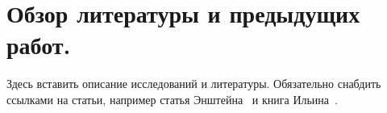 \section{Обзор литературы и предыдущих работ.}
Здесь вставить описание исследований и литературы. Обязательно снабдить ссылками на статьи, например статья Энштейна~\cite{einstein1905} и книга Ильина~\cite{ilyin1998}.
